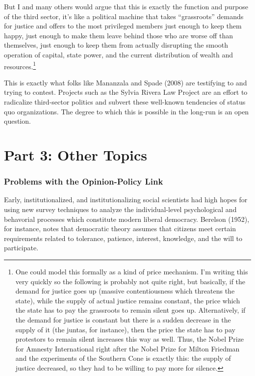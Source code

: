 \documentclass[12pt,book]{article}
\begin{document}
But I and many others would argue that this is exactly the function and
purpose of the third sector, it's like a political machine that takes
``grassroots'' demands for justice and offers to the most privileged
members just enough to keep them happy, just enough to make them leave
behind those who are worse off than themselves, just enough to keep them
from actually disrupting the smooth operation of capital, state power,
and the current distribution of wealth and resources.\footnote{One could
  model this formally as a kind of price mechanism. I'm writing this
  very quickly so the following is probably not quite right, but
  basically, if the demand for justice goes up (massive contentiousness
  which threatens the state), while the supply of actual justice remains
  constant, the price which the state has to pay the grassroots to
  remain silent goes up. Alternatively, if the demand for justice is
  constant but there is a sudden decrease in the supply of it (the
  juntas, for instance), then the price the state has to pay protestors
  to remain silent increases this way as well. Thus, the Nobel Prize for
  Amnesty International right after the Nobel Prize for Milton Friedman
  and the experiments of the Southern Cone is exactly this: the supply
  of justice decreased, so they had to be willing to pay more for
  silence.}

This is exactly what folks like Mananzala and Spade (2008) are
testifying to and trying to contest. Projects such as the Sylvia Rivera
Law Project are an effort to radicalize third-sector politics and
subvert these well-known tendencies of status quo organizations. The
degree to which this is possible in the long-run is an open question.

\section{Part 3: Other Topics}\label{part-3-other-topics}

\subsubsection{Problems with the Opinion-Policy
Link}\label{problems-with-the-opinion-policy-link}

Early, institutionalized, and institutionalizing social scientists had
high hopes for using new survey techniques to analyze the
individual-level psychological and behavorial processes which constitute
modern liberal democracy. Berelson (1952), for instance, notes that
democratic theory assumes that citizens meet certain requirements
related to tolerance, patience, interest, knowledge, and the will to
participate.
\end{document}

